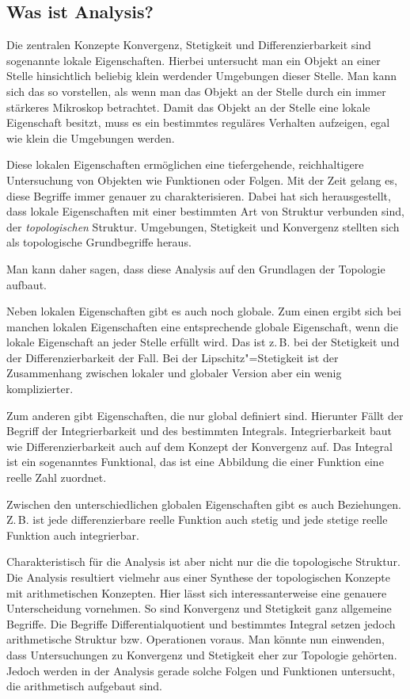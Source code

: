 \documentclass[a4paper,10pt,fleqn,twocolumn,twoside]{scrartcl}
\begin{document}
\subsection{Was ist Analysis?}

Die zentralen Konzepte Konvergenz, Stetigkeit und Differenzierbarkeit
sind sogenannte lokale Eigenschaften. Hierbei untersucht man ein
Objekt an einer Stelle hinsichtlich beliebig klein werdender Umgebungen
dieser Stelle. Man kann sich das so vorstellen, als wenn man das
Objekt an der Stelle durch ein immer stärkeres Mikroskop betrachtet.
Damit das Objekt an der Stelle eine lokale Eigenschaft besitzt,
muss es ein bestimmtes reguläres Verhalten aufzeigen, egal wie klein
die Umgebungen werden.

Diese lokalen Eigenschaften ermöglichen eine tiefergehende,
reichhaltigere Untersuchung von Objekten wie Funktionen oder Folgen.
Mit der Zeit gelang es, diese Begriffe immer genauer zu
charakterisieren. Dabei hat sich herausgestellt, dass lokale
Eigenschaften mit einer bestimmten Art von Struktur verbunden sind,
der \emph{topologischen} Struktur. Umgebungen, Stetigkeit und
Konvergenz stellten sich als topologische Grundbegriffe heraus.

Man kann daher sagen, dass diese Analysis auf den Grundlagen der
Topologie aufbaut.

Neben lokalen Eigenschaften gibt es auch noch globale. Zum einen
ergibt sich bei manchen lokalen Eigenschaften eine entsprechende
globale Eigenschaft, wenn die lokale Eigenschaft an jeder Stelle
erfüllt wird. Das ist z.\,B. bei der Stetigkeit und der
Differenzierbarkeit der Fall. Bei der Lipschitz"=Stetigkeit
ist der Zusammenhang zwischen lokaler und globaler Version aber
ein wenig komplizierter.

Zum anderen gibt Eigenschaften, die nur global definiert sind.
Hierunter Fällt der Begriff der Integrierbarkeit und des bestimmten
Integrals. Integrierbarkeit baut wie Differenzierbarkeit auch
auf dem Konzept der Konvergenz auf. Das Integral ist ein sogenanntes
Funktional, das ist eine Abbildung die einer Funktion eine reelle
Zahl zuordnet.

Zwischen den unterschiedlichen globalen Eigenschaften gibt es auch
Beziehungen. Z.\,B. ist jede differenzierbare reelle Funktion auch
stetig und jede stetige reelle Funktion auch integrierbar.

Charakteristisch für die Analysis ist aber nicht nur die die
topologische Struktur. Die Analysis resultiert vielmehr aus einer
Synthese der topologischen Konzepte mit arithmetischen Konzepten.
Hier lässt sich interessanterweise eine genauere Unterscheidung
vornehmen. So sind Konvergenz und Stetigkeit ganz allgemeine Begriffe.
Die Begriffe Differentialquotient und bestimmtes Integral setzen
jedoch arithmetische Struktur bzw. Operationen voraus. Man könnte
nun einwenden, dass Untersuchungen zu Konvergenz und Stetigkeit eher
zur Topologie gehörten. Jedoch werden in der Analysis gerade solche
Folgen und Funktionen untersucht, die arithmetisch aufgebaut sind.
\end{document}
